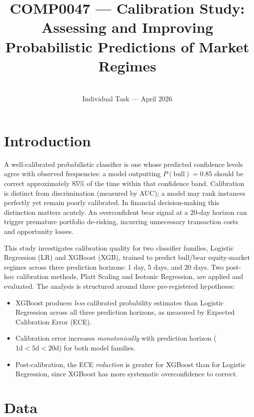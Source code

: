 \documentclass[12pt]{article}
\title{COMP0047 --- Calibration Study:\\
Assessing and Improving Probabilistic Predictions of Market Regimes}
\author{\\
\small Individual Task --- April 2026}
\date{}
\begin{document}
\maketitle

\section{Introduction}

A well-calibrated probabilistic classifier is one whose predicted confidence levels
agree with observed frequencies: a model outputting $P(\text{bull}) = 0.85$ should
be correct approximately 85\% of the time within that confidence band.
Calibration is distinct from discrimination (measured by AUC); a model may rank
instances perfectly yet remain poorly calibrated.
In financial decision-making this distinction matters acutely.
An overconfident bear signal at a 20-day horizon can trigger premature portfolio
de-risking, incurring unnecessary transaction costs and opportunity losses.

This study investigates calibration quality for two classifier families, 
Logistic Regression (LR) and XGBoost (XGB), trained to predict bull/bear
equity-market regimes across three prediction horizons: 1 day, 5 days, and 20 days.
Two post-hoc calibration methods, Platt Scaling and Isotonic Regression, are applied
and evaluated.
The analysis is structured around three pre-registered hypotheses:

\begin{itemize}[leftmargin=1.5em,itemsep=2pt,topsep=4pt]
  \item[\textbf{H1}] XGBoost produces \emph{less} calibrated probability estimates than
    Logistic Regression across all three prediction horizons, as measured by
    Expected Calibration Error (ECE).
  \item[\textbf{H2}] Calibration error increases \emph{monotonically} with prediction
    horizon ($1\text{d} < 5\text{d} < 20\text{d}$) for both model families.
  \item[\textbf{H3}] Post-calibration, the ECE \emph{reduction} is greater for XGBoost
    than for Logistic Regression, since XGBoost has more systematic overconfidence
    to correct.
\end{itemize}

\section{Data}
\end{document}
